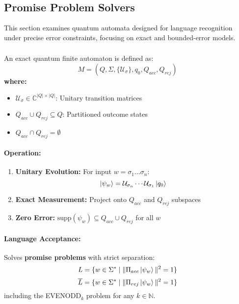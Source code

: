 \subsection{Promise Problem Solvers}
\label{sec:promise-qfa}

This section examines quantum automata designed for language recognition under precise error constraints, focusing on exact and bounded-error models.

\subsubsection{}
\label{subsec:exact-qfa}

\begin{definition}
An exact quantum finite automaton is defined as:
\[
M = (Q, \Sigma, \{\mathcal{U}_\sigma\}, q_0, Q_{acc}, Q_{rej})
\]
\textbf{where:}
\begin{itemize}
    \item $\mathcal{U}_\sigma \in \mathbb{C}^{|Q| \times |Q|}$: Unitary transition matrices
    \item $Q_{acc} \cup Q_{rej} \subseteq Q$: Partitioned outcome states
    \item $Q_{acc} \cap Q_{rej} = \emptyset$
\end{itemize}
\end{definition}

\paragraph{Operation:}
\begin{enumerate}
    \item \textbf{Unitary Evolution:} For input $w = \sigma_1...\sigma_n$:
    \[
    \ket{\psi_w} = \mathcal{U}_{\sigma_n} \cdots \mathcal{U}_{\sigma_1} \ket{q_0}
    \]
    \item \textbf{Exact Measurement:} Project onto $Q_{acc}$ and $Q_{rej}$ subspaces
    \item \textbf{Zero Error:} $\text{supp}(\psi_w) \subseteq Q_{acc} \cup Q_{rej}$ for all $w$ \cite{nayak1999optimal}
\end{enumerate}

\paragraph{Language Acceptance:}
Solves \textbf{promise problems} with strict separation:
\[
L = \{w \in \Sigma^* \mid \|\Pi_{acc}\ket{\psi_w}\|^2 = 1\}
\]
\[
\overline{L} = \{w \in \Sigma^* \mid \|\Pi_{rej}\ket{\psi_w}\|^2 = 1\}
\]
including the EVENODD$_k$ problem for any $k \in \mathbb{N}$.

